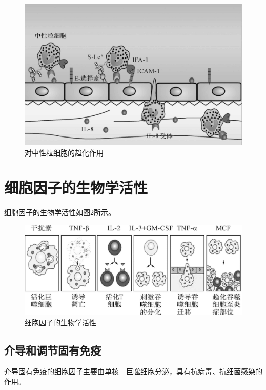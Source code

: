 \begin{figure}[!htbp]
 \centering
 \includegraphics{./images/Image00095.jpg}
 \captionsetup{justification=centering}
 \caption{对中性粒细胞的趋化作用}
 \label{fig6-5}
  \end{figure} 

\section{细胞因子的生物学活性}

细胞因子的生物学活性如图\ref{fig6-6}所示。

\begin{figure}[!htbp]
 \centering
 \includegraphics{./images/Image00096.jpg}
 \captionsetup{justification=centering}
 \caption{细胞因子的生物学活性}
 \label{fig6-6}
  \end{figure} 


\subsection{介导和调节固有免疫}

介导固有免疫的细胞因子主要由单核－巨噬细胞分泌，具有抗病毒、抗细菌感染的作用。

